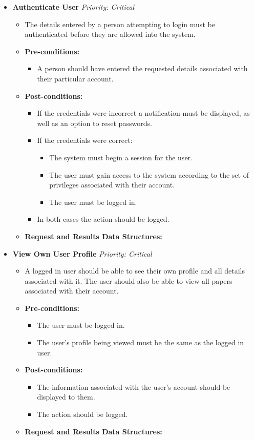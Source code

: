 \documentclass{article}
\begin{document}
\begin{itemize}
					\item \textbf{Authenticate User} \hfill \textit{Priority: Critical}
					\begin{itemize}
						\item The details entered by a person attempting to login must be authenticated before they are allowed into the system.
						\item \textbf{Pre-conditions:}
						\begin{itemize}
							\item A person should have entered the requested details associated with their particular account.
						\end{itemize}
						\item \textbf{Post-conditions:}
						\begin{itemize}
							\item If the credentials were incorrect a notification must be displayed, as well as an option to reset passwords.
							\item If the credentials were correct:
							\begin{itemize}
								\item The system must begin a session for the user.
								\item The user must gain access to the system according to the set of privileges associated with their account.
								\item The user must be logged in.
							\end{itemize}													
							\item In both cases the action should be logged.
						\end{itemize}
						\item \textbf{Request and Results Data Structures:}
					\end{itemize}
					
					\item \textbf{View Own User Profile} \hfill \textit{Priority: Critical}
					\begin{itemize}
						\item A logged in user should be able to see their own profile and all details associated with it. The user should also be able to view all papers associated with their account.
						\item \textbf{Pre-conditions:}
						\begin{itemize}
							\item The user must be logged in.
							\item The user's profile being viewed must be the same as the logged in user.
						\end{itemize}
						\item \textbf{Post-conditions:}
						\begin{itemize}
							\item The information associated with the user's account should be displayed to them.
							\item The action should be logged.
						\end{itemize}
						\item \textbf{Request and Results Data Structures:}
					\end{itemize}					
				\end{itemize}
\end{document}
